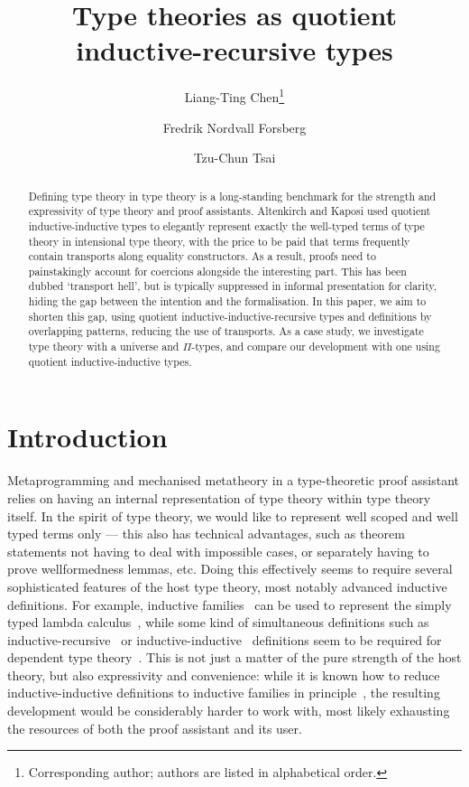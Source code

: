 \documentclass[a4paper,UKenglish,numberwithinsect,cleveref,thm-restate]{lipics-v2021}
\title{Type theories as quotient inductive-recursive types}
\author{Liang-Ting Chen\footnote{Corresponding author; authors are listed in alphabetical order.}}{Institute of Information Science, Academia Sinica, Taiwan \and \url{http://l-tchen.github.io}}{ltchen@iis.sinica.edu.tw}{https://orcid.org/0000-0002-3250-1331}{Supported by the National Science and Technology Council of Taiwan under grant NSTC 114-2222-E-001-001-MY3.}
\author{Fredrik Nordvall Forsberg}{Department of Computer and Information Sciences, University of Strathclyde, UK \and \url{https://fredriknf.com}}{fredrik.nordvall-forsberg@strath.ac.uk}{https://orcid.org/0000-0001-6157-9288}{Supported by the Engineering and Physical Sciences Research Council [EP/Y000455/1].}
\author{Tzu-Chun Tsai}{Institute of Information Science, Academia Sinica, Taiwan}{gene0905@icloud.com}{}{Supported by the National Science and Technology Council of Taiwan under grant NSTC 112-2221-E-001-003-MY3.}
\begin{document}
\maketitle

\begin{abstract}
  Defining type theory in type theory is a long-standing benchmark for the strength and expressivity of type theory and proof assistants.
  Altenkirch and Kaposi used quotient inductive-inductive types to elegantly represent exactly the well-typed terms of type theory in intensional type theory, with the price to be paid that terms frequently contain transports along equality constructors.
  As a result, proofs need to painstakingly account for coercions alongside the interesting part.
  This %
  has been dubbed `transport hell', but is typically suppressed in informal presentation for clarity, hiding the gap between the intention and the formalisation.
  In this paper, we aim to shorten this gap, using quotient inductive-inductive-recursive types and definitions by overlapping patterns, reducing the use of transports.
  As a case study, we investigate type theory with a universe and $\Pi$-types, and compare our development with one using quotient inductive-inductive types.
\end{abstract}

\section{Introduction} \label{sec:intro}

Metaprogramming and mechanised metatheory in a type-theoretic proof assistant relies on having an internal representation of type theory within type theory itself.
%
In the spirit of type theory, we would like to represent well scoped and well typed terms only --- this also has technical advantages, such as theorem statements not having to deal with impossible cases, or separately having to prove wellformedness lemmas, etc.
%
Doing this effectively seems to require several sophisticated features of the host type theory, most notably advanced inductive definitions.
%
For example, inductive families~\cite{Dybjer1994} can be used to represent the simply typed lambda calculus~\cite{Altenkirch1999}, while some kind of simultaneous definitions such as inductive-recursive~\cite{Dybjer2000} or inductive-inductive~\cite{Nordvall-Forsberg2014} definitions seem to be required for dependent type theory~\cite{Danielsson2006,Chapman2009}.
%
This is not just a matter of the pure strength of the host theory, but also expressivity and convenience: while it is known how to reduce inductive-inductive definitions to inductive families in principle~\cite{Kaposi2020a}, the resulting development would be considerably harder to work with, most likely exhausting the resources of both the proof assistant and its user.
\end{document}
